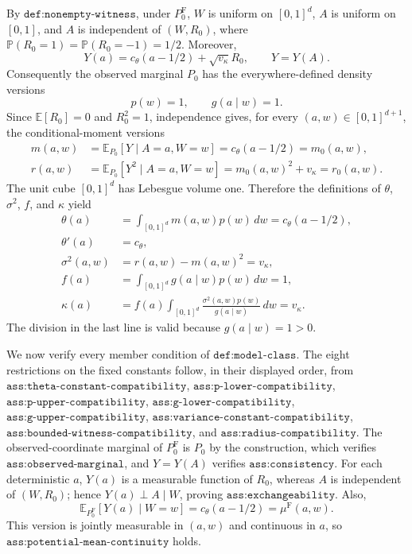 By \(\texttt{def:nonempty-witness}\), under \(P_0^{\mathrm F}\), \(W\) is uniform on \([0,1]^d\), \(A\) is uniform on \([0,1]\), and \(A\) is independent of \((W,R_0)\), where \(\mathbb P(R_0=1)=\mathbb P(R_0=-1)=1/2\). Moreover,
\[
Y(a)=c_{\theta}(a-1/2)+\sqrt{v_{\kappa}}R_0,
\qquad
Y=Y(A).
\]
Consequently the observed marginal \(P_0\) has the everywhere-defined density versions
\[
p(w)=1,
\qquad
g(a\mid w)=1.
\]
Since \(\mathbb E[R_0]=0\) and \(R_0^2=1\), independence gives, for every \((a,w)\in[0,1]^{d+1}\), the conditional-moment versions
\[
\begin{aligned}
m(a,w)
&=\mathbb E_{P_0}[Y\mid A=a,W=w]
=c_{\theta}(a-1/2)=m_0(a,w),\\
r(a,w)
&=\mathbb E_{P_0}[Y^2\mid A=a,W=w]
=m_0(a,w)^2+v_{\kappa}=r_0(a,w).
\end{aligned}
\]
The unit cube \([0,1]^d\) has Lebesgue volume one. Therefore the definitions of \(\theta\), \(\sigma^2\), \(f\), and \(\kappa\) yield
\[
\begin{aligned}
\theta(a)
&=\int_{[0,1]^d}m(a,w)p(w)\,dw
=c_{\theta}(a-1/2),\\
\theta'(a)&=c_{\theta},\\
\sigma^2(a,w)&=r(a,w)-m(a,w)^2=v_{\kappa},\\
f(a)&=\int_{[0,1]^d}g(a\mid w)p(w)\,dw=1,\\
\kappa(a)
&=f(a)\int_{[0,1]^d}\frac{\sigma^2(a,w)p(w)}{g(a\mid w)}\,dw
=v_{\kappa}.
\end{aligned}
\]
The division in the last line is valid because \(g(a\mid w)=1>0\).

We now verify every member condition of \(\texttt{def:model-class}\). The eight restrictions on the fixed constants follow, in their displayed order, from \(\texttt{ass:theta-constant-compatibility}\), \(\texttt{ass:p-lower-compatibility}\), \(\texttt{ass:p-upper-compatibility}\), \(\texttt{ass:g-lower-compatibility}\), \(\texttt{ass:g-upper-compatibility}\), \(\texttt{ass:variance-constant-compatibility}\), \(\texttt{ass:bounded-witness-compatibility}\), and \(\texttt{ass:radius-compatibility}\). The observed-coordinate marginal of \(P_0^{\mathrm F}\) is \(P_0\) by the construction, which verifies \(\texttt{ass:observed-marginal}\), and \(Y=Y(A)\) verifies \(\texttt{ass:consistency}\). For each deterministic \(a\), \(Y(a)\) is a measurable function of \(R_0\), whereas \(A\) is independent of \((W,R_0)\); hence \(Y(a)\perp A\mid W\), proving \(\texttt{ass:exchangeability}\). Also,
\[
\mathbb E_{P_0^{\mathrm F}}[Y(a)\mid W=w]
=c_{\theta}(a-1/2)=\mu^{\mathrm F}(a,w).
\]
This version is jointly measurable in \((a,w)\) and continuous in \(a\), so \(\texttt{ass:potential-mean-continuity}\) holds.

